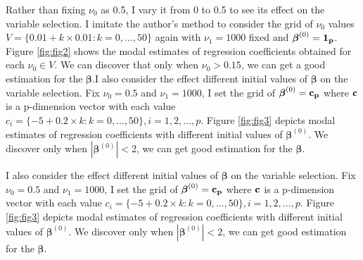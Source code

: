 \documentclass[]{book}
\begin{document}
Rather than fixing \(\nu_0\) as 0.5, I vary it from 0 to 0.5 to see its effect on the variable selection. I imitate the author's method to consider the grid of \(\nu_0\) values \(V=\{0.01+k\times 0.01:k=0,\ldots,50\}\) again with \(\nu_1=1000\) fixed and \({\boldsymbol \beta}^{(0)}=\bf{1}_p\). Figure \ref{fig:fig2} shows the modal estimates of regression coefficients obtained for each \(\nu_0\in V\). We can discover that only when \(\nu_0 >0.15\), we can get a good estimation for the \({\boldsymbol \beta}\).I also consider the effect different initial values of \({\boldsymbol \beta}\) on the variable selection. Fix \(\nu_0=0.5\) and \(\nu_1=1000\), I set the grid of \({\boldsymbol \beta}^{(0)}=\bf{c}_p\) where \(\bf{c}\) is a p-dimension vector with each value \(c_i = \{-5+0.2\times k:k=0,\ldots,50\}, i=1,2,\ldots,p\). Figure \ref{fig:fig3} depicts modal estimates of regression coefficients with different initial values of \({\boldsymbol \beta}^{(0)}\). We discover only when \(|{\boldsymbol \beta}^{(0)}|<2\), we can get good estimation for the \({\boldsymbol \beta}\).

I also consider the effect different initial values of \({\boldsymbol \beta}\) on the variable selection. Fix \(\nu_0=0.5\) and \(\nu_1=1000\), I set the grid of \({\boldsymbol \beta}^{(0)}=\bf{c}_p\) where \(\bf{c}\) is a p-dimension vector with each value \(c_i = \{-5+0.2\times k:k=0,\ldots,50\}, i=1,2,\ldots,p\). Figure \ref{fig:fig3} depicts modal estimates of regression coefficients with different initial values of \({\boldsymbol \beta}^{(0)}\). We discover only when \(|{\boldsymbol \beta}^{(0)}|<2\), we can get good estimation for the \({\boldsymbol \beta}\).
\end{document}
